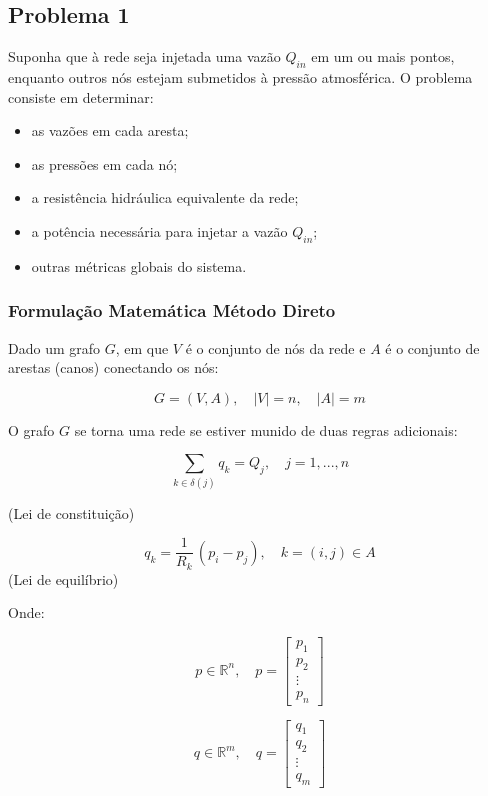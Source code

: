 \documentclass{article}
\begin{document}
\subsection{Problema 1}
\indent\indent Suponha que à rede seja injetada uma vazão $Q_{in}$ em um ou mais pontos, enquanto outros nós estejam submetidos à pressão atmosférica.
O problema consiste em determinar: 
\begin{itemize}
    \item as vazões em cada aresta;
    \item as pressões em cada nó;
    \item a resistência hidráulica equivalente da rede;
    \item a potência necessária para injetar a vazão $Q_{in}$;
    \item outras métricas globais do sistema. 
\end{itemize}

\subsubsection{Formulação Matemática Método Direto}
\indent\indent Dado um grafo $G$, em que $V$ é o conjunto de nós da rede e $A$ é o conjunto de arestas (canos) conectando os nós:

\[
G = (V, A), \quad |V| = n, \quad |A| = m
\]

O grafo $G$ se torna uma rede se estiver munido de duas regras adicionais:

\begin{equation}
\sum_{k \in \delta(j)} q_k = Q_j, \quad j = 1, ..., n
\label{eq:lei_constitutiva}
\end{equation}

(Lei de constituição)



\begin{equation}
q_k = \frac{1}{R_k} \, (p_i - p_j), \quad k=(i,j) \in A
\label{eq:lei_balanco}
\end{equation}
(Lei de equilíbrio)

Onde:

\[
 p \in \mathbb{R}^n, \quad
p =
\begin{bmatrix}
p_1 \\
p_2 \\
\vdots \\
p_n
\end{bmatrix}
\]

\[
q \in \mathbb{R}^m, \quad
q =
\begin{bmatrix}
q_1 \\
q_2 \\
\vdots \\
q_m
\end{bmatrix}
\]
\end{document}
